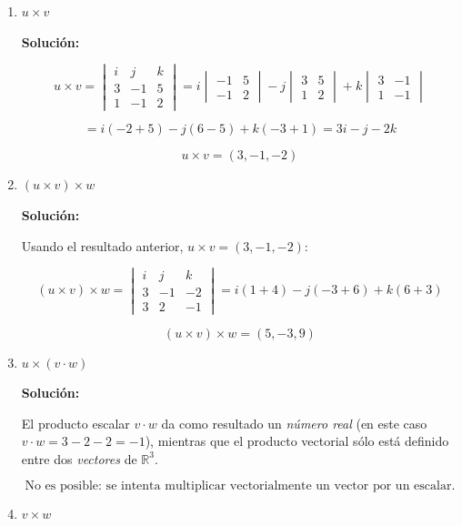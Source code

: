 \documentclass[12pt]{article}
\newcommand{\solucion}{%
    \vspace{0.8em}%
    \textbf{Solución:}%
    \vspace{0.8em}%
}
\begin{document}
\begin{enumerate}[label=\alph*.-]

    \item $u\times v$

    \solucion

    \[
    u\times v=\begin{vmatrix}
    i & j & k\\
    3 & -1 & 5\\
    1 & -1 & 2
    \end{vmatrix}
    =i\begin{vmatrix}-1&5\\-1&2\end{vmatrix}
    -j\begin{vmatrix}3&5\\1&2\end{vmatrix}
    +k\begin{vmatrix}3&-1\\1&-1\end{vmatrix}
    \]

    \[
    =i(-2+5)-j(6-5)+k(-3+1)=3i-j-2k
    \]

    \[
    \boxed{u\times v=(3,-1,-2)}
    \]

    \item $(u\times v)\times w$

    \solucion

    Usando el resultado anterior, $u\times v=(3,-1,-2)$:

    \[
    (u\times v)\times w=\begin{vmatrix}
    i & j & k\\
    3 & -1 & -2\\
    3 & 2 & -1
    \end{vmatrix}
    =i(1+4)-j(-3+6)+k(6+3)
    \]

    \[
    \boxed{(u\times v)\times w=(5,-3,9)}
    \]

    \item $u\times(v\cdot w)$

    \solucion

    El producto escalar $v\cdot w$ da como resultado un \emph{número real}
    (en este caso $v\cdot w=3-2-2=-1$), mientras que el producto vectorial
    sólo está definido entre dos \emph{vectores} de $\mathbb{R}^3$.

    \[
    \boxed{\text{No es posible: se intenta multiplicar vectorialmente un
    vector por un escalar.}}
    \]

    \item $v\times w$


\end{enumerate}
\end{document}
